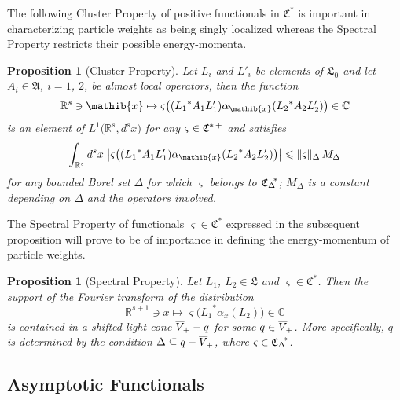 \documentclass[a4paper,a4paper]{article}
\numberwithin{equation}{section}
\newcommand{\Cbb}{\mathbb{C}}
\newcommand{\Afrak}{\mathfrak{A}}
\newcommand{\Lfrak}{\mathfrak{L}}
\newcommand{\xib}{\mathib{x}}
\newcommand{\Rs}{\mathbb{R}^s}
\newcommand{\Rsone}{\mathbb{R}^{s + 1}}
\newcommand{\fwcone}{\overline{V}_{\negthinspace +}}
\newcommand{\Cstar}{\mathfrak{C}^*}
\newcommand{\Cstarplus}{\mathfrak{C}^{* \thinspace +}}
\newcommand{\CDstar}{{\mathfrak{C}_\Delta}^{\negthickspace *}}
\newcommand{\aibx}{\alpha_\mathib{x}}
\newcommand{\ax}{\alpha_x}
\theoremstyle{definition}
\theoremstyle{plain}
\newtheorem{proposition}[definition]{Proposition}
\theoremstyle{remark}
\newcommand{\babs}[1]{\bigl\lvert #1 \bigr\rvert}
\newcommand{\norm}[1]{\lVert #1 \rVert}
\begin{document}
  The following Cluster Property of positive functionals in $\Cstar$
  is important in characterizing particle weights as being singly
  localized whereas the Spectral Property restricts their possible
  energy-momenta.
  \begin{proposition}[Cluster Property]
    \label{pro:cluster}
    Let $L_i$ and $L'_i$ be elements of $\Lfrak_0$ and let $A_i \in
    \Afrak$, $i = 1$, $2$, be almost local operators, then the
    function
    \begin{equation}
      \label{eq:cluster-function}
      \Rs \ni \xib \mapsto \varsigma \bigl( ( {L_1}^* A_1 L'_1 ) \aibx
      ( {L_2}^* A_2 L'_2 ) \bigr) \in \Cbb
    \end{equation}
    is an element of $L^1 \bigl( \Rs , d^s x \bigr)$ for any
    $\varsigma \in \Cstarplus$ and satisfies
    \begin{equation}
      \label{eq:cluster}
      \int_{\Rs} d^s x \; \babs{\varsigma \bigl( ( {L_1}^* A_1 L'_1 )
      \aibx ( {L_2}^* A_2 L'_2 ) \bigr)} \leqslant
      \norm{\varsigma}_\Delta \, M_\Delta
    \end{equation}
    for any bounded Borel set $\Delta$ for which $\varsigma$ belongs
    to $\CDstar$; $M_\Delta$ is a constant depending on $\Delta$ and
    the operators involved.
  \end{proposition}
  The Spectral Property of functionals $\varsigma \in \Cstar$
  expressed in the subsequent proposition will prove to be of
  importance in defining the energy-momentum of particle weights.
  \begin{proposition}[Spectral Property]
    \label{pro:spectral-property}
    Let $L_1$, $L_2 \in \Lfrak$ and $\varsigma \in \Cstar$. Then
    the support of the Fourier transform of the distribution
    \begin{equation*}
      \Rsone \ni x \mapsto \varsigma \bigl( {L_1}^* \ax ( L_2 ) \bigr)
      \in \Cbb
    \end{equation*}
    is contained in a shifted light cone $\fwcone - q$ for some $q \in
    \fwcone$. More specifically, $q$ is determined by the condition
    $\Delta \subseteq q - \fwcone$, where $\varsigma \in \CDstar$.
  \end{proposition}

\subsection{Asymptotic Functionals}
  \label{subsec:asymptotic_functionals}
  
\end{document}
